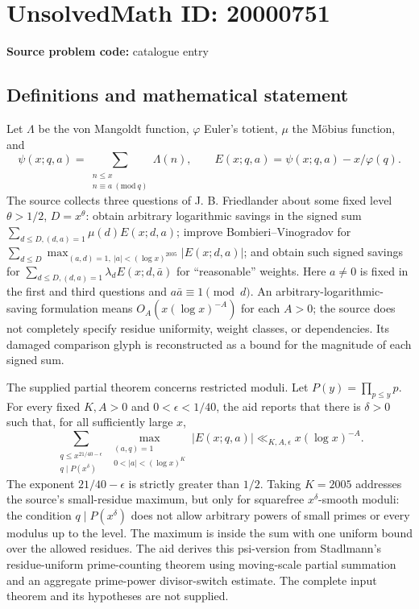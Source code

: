 \documentclass[11pt]{article}
\begin{document}
\section*{UnsolvedMath ID: 20000751}
\textbf{Source problem code:} catalogue entry
\subsection{Definitions and mathematical statement}
Let \(\Lambda\) be the von Mangoldt function, \(\varphi\) Euler's totient, \(\mu\) the M\"obius function, and
\[
 \psi(x;q,a)=\sum_{\substack{n\leq x\\n\equiv a\ (\mathrm{mod}\ q)}}\Lambda(n),\qquad
 E(x;q,a)=\psi(x;q,a)-x/\varphi(q).
\]
The source collects three questions of J. B. Friedlander about some fixed level \(\theta>1/2\), \(D=x^\theta\): obtain arbitrary logarithmic savings in the signed sum \(\sum_{d\leq D,(d,a)=1}\mu(d)E(x;d,a)\); improve Bombieri--Vinogradov for \(\sum_{d\leq D}\max_{(a,d)=1,\ |a|<(\log x)^{2005}}|E(x;d,a)|\); and obtain such signed savings for \(\sum_{d\leq D,(d,a)=1}\lambda_dE(x;d,\bar a)\) for ``reasonable'' weights. Here \(a\neq0\) is fixed in the first and third questions and \(a\bar a\equiv1\pmod d\). An arbitrary-logarithmic-saving formulation means \(O_A(x(\log x)^{-A})\) for each \(A>0\); the source does not completely specify residue uniformity, weight classes, or dependencies. Its damaged comparison glyph is reconstructed as a bound for the magnitude of each signed sum.

The supplied partial theorem concerns restricted moduli. Let \(P(y)=\prod_{p\leq y}p\). For every fixed \(K,A>0\) and \(0<\epsilon<1/40\), the aid reports that there is \(\delta>0\) such that, for all sufficiently large \(x\),
\[
 \sum_{\substack{q\leq x^{21/40-\epsilon}\\q\mid P(x^\delta)}}
 \max_{\substack{(a,q)=1\\0<|a|<(\log x)^K}}
 |E(x;q,a)|\ll_{K,A,\epsilon}x(\log x)^{-A}.
\]
The exponent \(21/40-\epsilon\) is strictly greater than \(1/2\). Taking \(K=2005\) addresses the source's small-residue maximum, but only for squarefree \(x^\delta\)-smooth moduli: the condition \(q\mid P(x^\delta)\) does not allow arbitrary powers of small primes or every modulus up to the level. The maximum is inside the sum with one uniform bound over the allowed residues. The aid derives this psi-version from Stadlmann's residue-uniform prime-counting theorem using moving-scale partial summation and an aggregate prime-power divisor-switch estimate. The complete input theorem and its hypotheses are not supplied.
\end{document}
